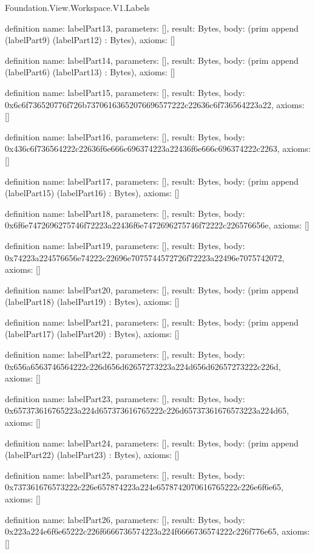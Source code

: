 \begin{lexlean}{Foundation.View.Workspace.V1.Labels}
\begin{semanticmodule}
definition{
  name: labelPart13,
  parameters: [],
  result: Bytes,
  body: (prim append (labelPart9) (labelPart12) : Bytes),
  axioms: []
}

definition{
  name: labelPart14,
  parameters: [],
  result: Bytes,
  body: (prim append (labelPart6) (labelPart13) : Bytes),
  axioms: []
}

definition{
  name: labelPart15,
  parameters: [],
  result: Bytes,
  body: 0x6c6f736520776f726b73706163652076696577222c22636c6f736564223a22,
  axioms: []
}

definition{
  name: labelPart16,
  parameters: [],
  result: Bytes,
  body: 0x436c6f736564222c22636f6e666c696374223a22436f6e666c696374222c2263,
  axioms: []
}

definition{
  name: labelPart17,
  parameters: [],
  result: Bytes,
  body: (prim append (labelPart15) (labelPart16) : Bytes),
  axioms: []
}

definition{
  name: labelPart18,
  parameters: [],
  result: Bytes,
  body: 0x6f6e7472696275746f72223a22436f6e7472696275746f72222c226576656e,
  axioms: []
}

definition{
  name: labelPart19,
  parameters: [],
  result: Bytes,
  body: 0x74223a224576656e74222c22696e7075744572726f72223a22496e7075742072,
  axioms: []
}

definition{
  name: labelPart20,
  parameters: [],
  result: Bytes,
  body: (prim append (labelPart18) (labelPart19) : Bytes),
  axioms: []
}

definition{
  name: labelPart21,
  parameters: [],
  result: Bytes,
  body: (prim append (labelPart17) (labelPart20) : Bytes),
  axioms: []
}

definition{
  name: labelPart22,
  parameters: [],
  result: Bytes,
  body: 0x656a6563746564222c226d656d62657273223a224d656d62657273222c226d,
  axioms: []
}

definition{
  name: labelPart23,
  parameters: [],
  result: Bytes,
  body: 0x657373616765223a224d657373616765222c226d65737361676573223a224d65,
  axioms: []
}

definition{
  name: labelPart24,
  parameters: [],
  result: Bytes,
  body: (prim append (labelPart22) (labelPart23) : Bytes),
  axioms: []
}

definition{
  name: labelPart25,
  parameters: [],
  result: Bytes,
  body: 0x737361676573222c226e657874223a224e6578742070616765222c226e6f6e65,
  axioms: []
}

definition{
  name: labelPart26,
  parameters: [],
  result: Bytes,
  body: 0x223a224e6f6e65222c226f6666736574223a224f6666736574222c226f776e65,
  axioms: []
}


\end{semanticmodule}
\end{lexlean}
